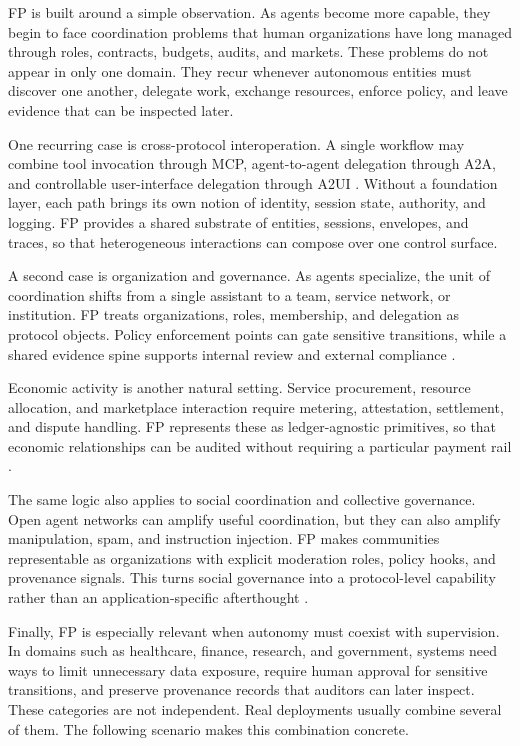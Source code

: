 \documentclass{llmxive}
\begin{document}
FP is built around a simple observation. As agents become more capable, they begin to face coordination problems that human organizations have long managed through roles, contracts, budgets, audits, and markets. These problems do not appear in only one domain. They recur whenever autonomous entities must discover one another, delegate work, exchange resources, enforce policy, and leave evidence that can be inspected later.

One recurring case is cross-protocol interoperation. A single workflow may combine tool invocation through MCP, agent-to-agent delegation through A2A, and controllable user-interface delegation through A2UI \cite{mcp_spec,a2a_spec,a2ui_spec}. Without a foundation layer, each path brings its own notion of identity, session state, authority, and logging. FP provides a shared substrate of entities, sessions, envelopes, and traces, so that heterogeneous interactions can compose over one control surface.

A second case is organization and governance. As agents specialize, the unit of coordination shifts from a single assistant to a team, service network, or institution. FP treats organizations, roles, membership, and delegation as protocol objects. Policy enforcement points can gate sensitive transitions, while a shared evidence spine supports internal review and external compliance \cite{agi_economics,virtual_agent_economies}.

Economic activity is another natural setting. Service procurement, resource allocation, and marketplace interaction require metering, attestation, settlement, and dispute handling. FP represents these as ledger-agnostic primitives, so that economic relationships can be audited without requiring a particular payment rail \cite{ucp_spec}.

The same logic also applies to social coordination and collective governance. Open agent networks can amplify useful coordination, but they can also amplify manipulation, spam, and instruction injection. FP makes communities representable as organizations with explicit moderation roles, policy hooks, and provenance signals. This turns social governance into a protocol-level capability rather than an application-specific afterthought \cite{moltbook_site,wired_moltbook,microsoft_openclaw_security}.

Finally, FP is especially relevant when autonomy must coexist with supervision. In domains such as healthcare, finance, research, and government, systems need ways to limit unnecessary data exposure, require human approval for sensitive transitions, and preserve provenance records that auditors can later inspect. These categories are not independent. Real deployments usually combine several of them. The following scenario makes this combination concrete.
\end{document}
